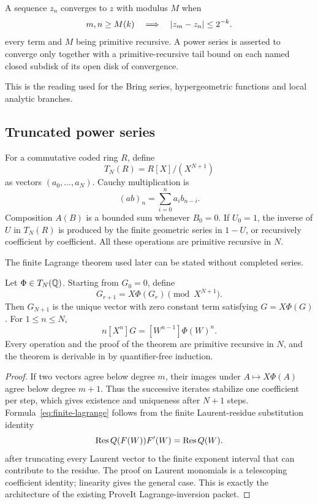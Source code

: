 \begin{definition}
A sequence \(z_n\) converges to \(z\) with modulus \(M\) when
\[
 m,n\ge M(k)\quad\Longrightarrow\quad
 \left|z_m-z_n\right|\le 2^{-k}.
\]
every term and \(M\) being primitive recursive.  A power series is asserted to
converge only together with a primitive-recursive tail bound on each named
closed subdisk of its open disk of convergence.
\end{definition}

This is the reading used for the Bring series, hypergeometric functions and
local analytic branches.

\subsection{Truncated power series}

For a commutative coded ring \(R\), define
\[
  T_N(R)=R[X]/(X^{N+1})
\]
as vectors \((a_0,\ldots,a_N)\).  Cauchy multiplication is
\[
  (ab)_n=\sum_{i=0}^{n}a_i b_{n-i}.
\]
Composition \(A(B)\) is a bounded sum whenever \(B_0=0\).  If \(U_0=1\), the
inverse of \(U\) in \(T_N(R)\) is produced by the finite geometric series in
\(1-U\), or recursively coefficient by coefficient.  All these operations are
primitive recursive in \(N\).

The finite Lagrange theorem used later can be stated without completed series.

\begin{theorem}\label{thm:finite-lagrange}
Let \(\Phi\in T_N(\mathbb Q)\).  Starting from \(G_0=0\), define
\[
 G_{r+1}=X\Phi(G_r)\pmod{X^{N+1}}.
\]
Then \(G_{N+1}\) is the unique vector with zero constant term satisfying
\(G=X\Phi(G)\).  For \(1\le n\le N\),
\begin{equation}\label{eq:finite-lagrange}
 n[X^n]G=[W^{n-1}]\Phi(W)^n.
\end{equation}
Every operation and the proof of the theorem are primitive recursive in \(N\),
and the theorem is derivable in \ipra{} by quantifier-free induction.
\end{theorem}

\begin{proof}
If two vectors agree below degree \(m\), their images under
\(A\mapsto X\Phi(A)\) agree below degree \(m+1\).  Thus the successive iterates
stabilize one coefficient per step, which gives existence and uniqueness after
\(N+1\) steps.  Formula~\eqref{eq:finite-lagrange} follows from the finite
Laurent-residue substitution identity
\[
 \operatorname{Res} Q(F(W))F'(W)=\operatorname{Res} Q(W).
\]
after truncating every Laurent vector to the finite exponent interval that can
contribute to the residue.  The proof on Laurent monomials is a telescoping
coefficient identity; linearity gives the general case.  This is exactly the
architecture of the existing ProveIt Lagrange-inversion packet.
\end{proof}

